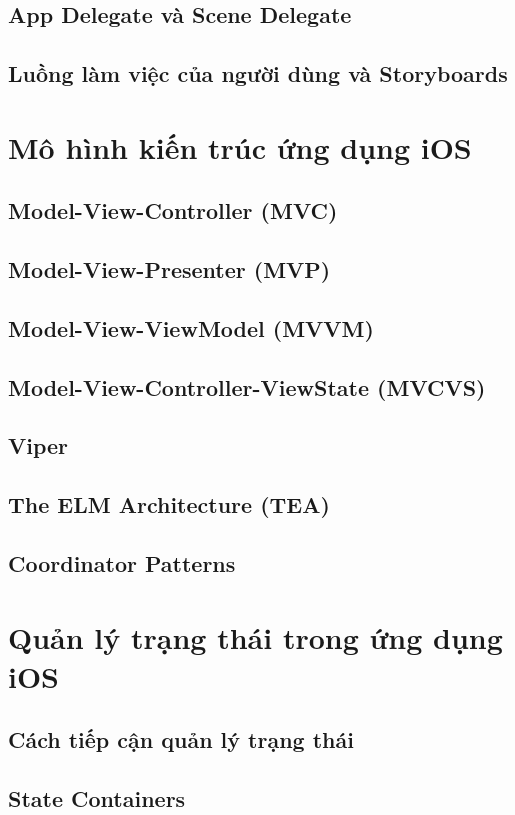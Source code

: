    \subsection{App Delegate và Scene Delegate}	
   \subsection{Luồng làm việc của người dùng và Storyboards
   }
\section{Mô hình kiến trúc ứng dụng iOS
}
    \subsection{Model-View-Controller (MVC)}
    \subsection{Model-View-Presenter (MVP)}
    \subsection{Model-View-ViewModel (MVVM)}
    \subsection{Model-View-Controller-ViewState (MVCVS)}
    \subsection{Viper}
    \subsection{The ELM Architecture (TEA)}
    \subsection{Coordinator Patterns}
\section{
    Quản lý trạng thái trong ứng dụng iOS
}
    \subsection{Cách tiếp cận quản lý trạng thái}
    \subsection{State Containers}
